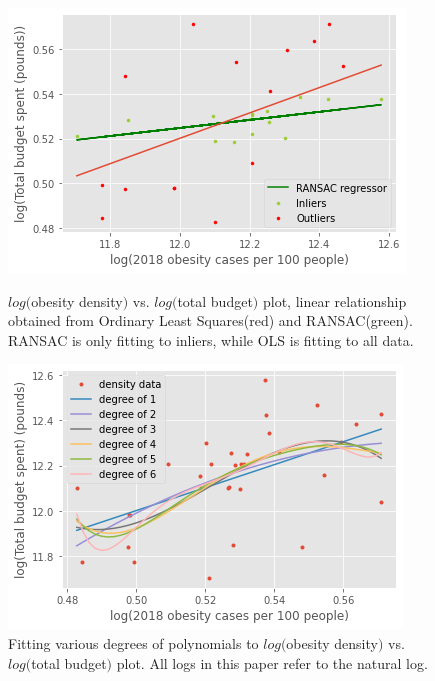 \documentclass[12pt]{article}
\begin{document}
\begin{figure}[!htb]
   \begin{minipage}{0.48\textwidth}
     \centering
     \includegraphics[width=.95\linewidth]{RANSAC.png}
     \captionsetup{font=scriptsize}
     \caption{$log($obesity density$)$ vs. $log($total budget$)$ plot, linear relationship obtained from Ordinary Least Squares(red) and RANSAC(green). RANSAC is only fitting to inliers, while OLS is fitting to all data.}\label{RANSAC}
   \end{minipage}\hfill
   \begin{minipage}{0.48\textwidth}
     \centering
     \includegraphics[width=.95\linewidth]{poly.png}
     \captionsetup{font=scriptsize}
     \caption{Fitting various degrees of polynomials to $log($obesity density$)$ vs. $log($total budget$)$ plot. All logs in this paper refer to the natural log.}\label{Poly}
   \end{minipage}
\end{figure}
\end{document}
